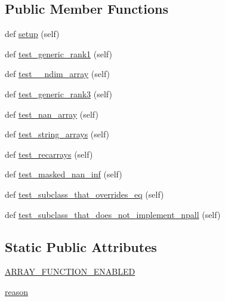 \subsection*{Public Member Functions}
\begin{DoxyCompactItemize}
\item 
def \hyperlink{classnumpy_1_1testing_1_1tests_1_1test__utils_1_1TestArrayEqual_ac502ace435fe9bab0fd357458fd2ecdb}{setup} (self)
\item 
def \hyperlink{classnumpy_1_1testing_1_1tests_1_1test__utils_1_1TestArrayEqual_a7b067b083cc6065ae1c44a1bf7535334}{test\+\_\+generic\+\_\+rank1} (self)
\item 
def \hyperlink{classnumpy_1_1testing_1_1tests_1_1test__utils_1_1TestArrayEqual_a1db9654f88499affad42b9b4b26eebec}{test\+\_\+\_\+ndim\+\_\+array} (self)
\item 
def \hyperlink{classnumpy_1_1testing_1_1tests_1_1test__utils_1_1TestArrayEqual_a93879ed9144544c9449df56fb7c4fb73}{test\+\_\+generic\+\_\+rank3} (self)
\item 
def \hyperlink{classnumpy_1_1testing_1_1tests_1_1test__utils_1_1TestArrayEqual_ad48603112f7211b6de996fad6bbac13e}{test\+\_\+nan\+\_\+array} (self)
\item 
def \hyperlink{classnumpy_1_1testing_1_1tests_1_1test__utils_1_1TestArrayEqual_aedff5620ba3d4bcac2f8de7fcc1c120e}{test\+\_\+string\+\_\+arrays} (self)
\item 
def \hyperlink{classnumpy_1_1testing_1_1tests_1_1test__utils_1_1TestArrayEqual_a47ce6d71eec71c9dcf2e367e730b6a03}{test\+\_\+recarrays} (self)
\item 
def \hyperlink{classnumpy_1_1testing_1_1tests_1_1test__utils_1_1TestArrayEqual_a4af90fe9c37ad05778f4a385ac5eed9d}{test\+\_\+masked\+\_\+nan\+\_\+inf} (self)
\item 
def \hyperlink{classnumpy_1_1testing_1_1tests_1_1test__utils_1_1TestArrayEqual_a70b522521f3503c7f2781fc13b9c01d9}{test\+\_\+subclass\+\_\+that\+\_\+overrides\+\_\+eq} (self)
\item 
def \hyperlink{classnumpy_1_1testing_1_1tests_1_1test__utils_1_1TestArrayEqual_a3a6ddfb21c3fa0c297bfcce76645c83f}{test\+\_\+subclass\+\_\+that\+\_\+does\+\_\+not\+\_\+implement\+\_\+npall} (self)
\end{DoxyCompactItemize}
\subsection*{Static Public Attributes}
\begin{DoxyCompactItemize}
\item 
\hyperlink{classnumpy_1_1testing_1_1tests_1_1test__utils_1_1TestArrayEqual_a6ccbac9280f591630d5e95f15f18a6fe}{A\+R\+R\+A\+Y\+\_\+\+F\+U\+N\+C\+T\+I\+O\+N\+\_\+\+E\+N\+A\+B\+L\+ED}
\item 
\hyperlink{classnumpy_1_1testing_1_1tests_1_1test__utils_1_1TestArrayEqual_a2432958dfa4feb8a98c70777558c8bff}{reason}
\end{DoxyCompactItemize}


